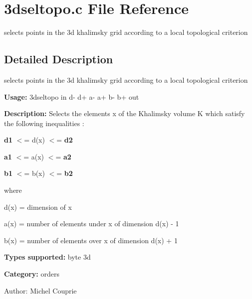 \section{3dseltopo.c File Reference}
\label{3dseltopo_8c}
selects points in the 3d khalimsky grid according to a local topological criterion 



\subsection{Detailed Description}
selects points in the 3d khalimsky grid according to a local topological criterion 

{\bf Usage:} 3dseltopo in d- d+ a- a+ b- b+ out

{\bf Description:} Selects the elements x of the Khalimsky volume K which satisfy the following inequalities :

{\bf d1} $<$= d(x) $<$= {\bf d2} 

{\bf a1} $<$= a(x) $<$= {\bf a2} 

{\bf b1} $<$= b(x) $<$= {\bf b2} 

where

d(x) = dimension of x

a(x) = number of elements under x of dimension d(x) - 1

b(x) = number of elements over x of dimension d(x) + 1

{\bf Types supported:} byte 3d

{\bf Category:} orders

\begin{Desc}
\item[Author:]Michel Couprie \end{Desc}
